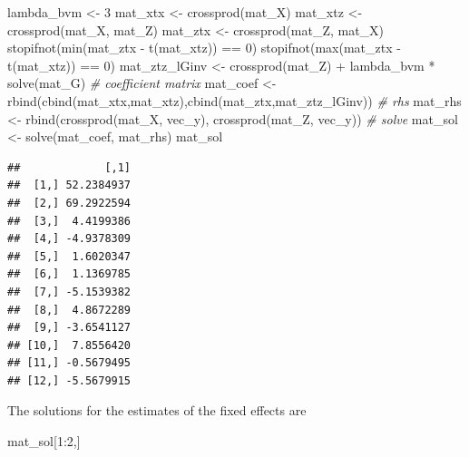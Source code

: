 \documentclass[
]{article}
\newenvironment{Shaded}{\begin{snugshade}}{\end{snugshade}}
\newcommand{\CommentTok}[1]{\textcolor[rgb]{0.56,0.35,0.01}{\textit{#1}}}
\newcommand{\DecValTok}[1]{\textcolor[rgb]{0.00,0.00,0.81}{#1}}
\newcommand{\FunctionTok}[1]{\textcolor[rgb]{0.00,0.00,0.00}{#1}}
\newcommand{\NormalTok}[1]{#1}
\newcommand{\OtherTok}[1]{\textcolor[rgb]{0.56,0.35,0.01}{#1}}
\newcommand{\SpecialCharTok}[1]{\textcolor[rgb]{0.00,0.00,0.00}{#1}}
\begin{document}
\begin{Shaded}
\begin{Highlighting}[]
\NormalTok{lambda\_bvm }\OtherTok{\textless{}{-}} \DecValTok{3}
\NormalTok{mat\_xtx }\OtherTok{\textless{}{-}} \FunctionTok{crossprod}\NormalTok{(mat\_X)}
\NormalTok{mat\_xtz }\OtherTok{\textless{}{-}} \FunctionTok{crossprod}\NormalTok{(mat\_X, mat\_Z)}
\NormalTok{mat\_ztx }\OtherTok{\textless{}{-}} \FunctionTok{crossprod}\NormalTok{(mat\_Z, mat\_X)}
\FunctionTok{stopifnot}\NormalTok{(}\FunctionTok{min}\NormalTok{(mat\_ztx }\SpecialCharTok{{-}} \FunctionTok{t}\NormalTok{(mat\_xtz)) }\SpecialCharTok{==} \DecValTok{0}\NormalTok{)}
\FunctionTok{stopifnot}\NormalTok{(}\FunctionTok{max}\NormalTok{(mat\_ztx }\SpecialCharTok{{-}} \FunctionTok{t}\NormalTok{(mat\_xtz)) }\SpecialCharTok{==} \DecValTok{0}\NormalTok{)}
\NormalTok{mat\_ztz\_lGinv }\OtherTok{\textless{}{-}} \FunctionTok{crossprod}\NormalTok{(mat\_Z) }\SpecialCharTok{+}\NormalTok{ lambda\_bvm }\SpecialCharTok{*} \FunctionTok{solve}\NormalTok{(mat\_G)}
\CommentTok{\# coefficient matrix}
\NormalTok{mat\_coef }\OtherTok{\textless{}{-}} \FunctionTok{rbind}\NormalTok{(}\FunctionTok{cbind}\NormalTok{(mat\_xtx,mat\_xtz),}\FunctionTok{cbind}\NormalTok{(mat\_ztx,mat\_ztz\_lGinv))}
\CommentTok{\# rhs}
\NormalTok{mat\_rhs }\OtherTok{\textless{}{-}} \FunctionTok{rbind}\NormalTok{(}\FunctionTok{crossprod}\NormalTok{(mat\_X, vec\_y),}
                 \FunctionTok{crossprod}\NormalTok{(mat\_Z, vec\_y))}
\CommentTok{\# solve}
\NormalTok{mat\_sol }\OtherTok{\textless{}{-}} \FunctionTok{solve}\NormalTok{(mat\_coef, mat\_rhs)}
\NormalTok{mat\_sol}
\end{Highlighting}
\end{Shaded}

\begin{verbatim}
##             [,1]
##  [1,] 52.2384937
##  [2,] 69.2922594
##  [3,]  4.4199386
##  [4,] -4.9378309
##  [5,]  1.6020347
##  [6,]  1.1369785
##  [7,] -5.1539382
##  [8,]  4.8672289
##  [9,] -3.6541127
## [10,]  7.8556420
## [11,] -0.5679495
## [12,] -5.5679915
\end{verbatim}

The solutions for the estimates of the fixed effects are

\begin{Shaded}
\begin{Highlighting}[]
\NormalTok{mat\_sol[}\DecValTok{1}\SpecialCharTok{:}\DecValTok{2}\NormalTok{,]}
\end{Highlighting}
\end{Shaded}
\end{document}
